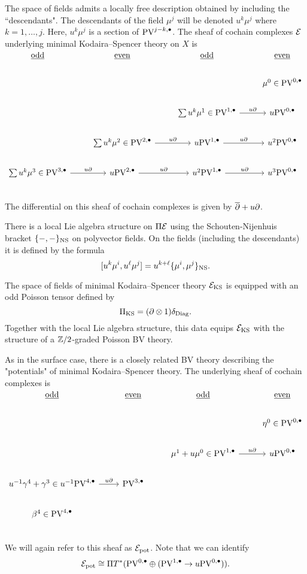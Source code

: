 \documentclass[11pt]{amsart}
\def\PV{{\rm PV}}
\begin{document}
The space of fields admits a locally free description obtained by including the ``descendants". The descendants of the field $\mu^j$ will be denoted $u^k \mu^j$ where $k = 1,\ldots, j$.
Here, $u^k \mu^j$ is a section of $\PV^{j - k, \bu}$.
The sheaf of cochain complexes $\mathcal E$ underlying minimal Kodaira--Spencer theory on $X$ is
\[\begin{tikzcd}
\ul{\rm odd} & \ul{\rm even} & \ul{\rm odd} & \ul{\rm even} \\
& & & \mu^0 \in \PV^{0,\bu} \\
& & \sum u^k \mu^1 \in \PV^{1,\bu} \ar[r, "u \partial"] & u \PV^{0,\bu} \\
& \sum u^k \mu^2 \in  \PV^{2,\bu} \ar[r,"u \partial"] & u \PV^{1,\bu} \ar[r, "u \partial"] & u^2 \PV^{0,\bu} \\
\sum u^k \mu^3 \in \PV^{3,\bu} \ar[r, "u \partial"]& u \PV^{2,\bu} \ar[r,"u \partial"] & u^2 \PV^{1,\bu} \ar[r, "u \partial"] & u^3\PV^{0,\bu} \\
\end{tikzcd}
\]
The differential on this sheaf of cochain complexes is given by $\overline{\partial} + u \partial$.

There is a local Lie algebra structure on $\Pi\mathcal E$ using the Schouten-Nijenhuis bracket $\{-,-\}_{\rm NS}$ on polyvector fields.
On the fields (including the descendants) it is defined by the formula
\[
[u^k \mu^i , u^\ell \mu^j] = u^{k+\ell} \{\mu^i, \mu^j\}_{\rm NS}.
\]

The space of fields of minimal Kodaira--Spencer theory $\mathcal E_{\rm KS}$ is equipped with an odd Poisson tensor defined by
\[
\Pi_{\rm KS} = (\partial \otimes 1) \delta_{\rm Diag} .
\]
Together with the local Lie algebra structure, this data equips $\mathcal E_{\rm KS}$ with the structure of a $\mathbb Z/2$-graded Poisson BV theory.

As in the surface case, there is a closely related BV theory describing the "potentials" of minimal Kodaira--Spencer theory. The underlying sheaf of cochain complexes is
\[
\begin{tikzcd}
\ul{\rm odd} & \ul{\rm even} & \ul{\rm odd} & \ul{\rm even} \\
& & & \eta^{0}\in\PV^{0,\bu} \\
& & \mu^{1}+u\mu^{0}\in\PV^{1,\bu} \ar[r, "u \partial"] & u \PV^{0,\bu} \\
u^{-1} \gamma^4 + \gamma^3  \in u^{-1} \PV^{4,\bu} \ar[r, "u \partial"] & \PV^{3,\bu} & &  \\
\beta^{4} \in\PV^{4,\bu} &  &  & \\
\end{tikzcd}
\]
We will again refer to this sheaf as $\mathcal E_{\rm pot}$. Note that we can identify \[\cE_{\rm pot}\cong \Pi T^{*}(\PV^{0,\bu}\oplus (\PV^{1,\bu}\to u\PV^{0,\bu})).\]
\end{document}
